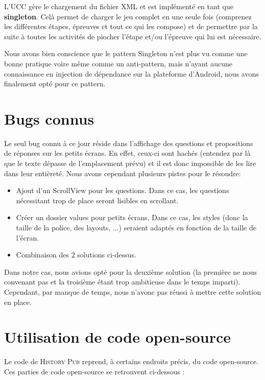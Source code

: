 \documentclass[11pt]{scrreprt}
\begin{document}
    L'UCC gère le chargement du fichier XML et est implémenté en tant que \textbf{singleton}. Celà permet de charger le jeu complet en une seule fois (comprenez les différentes étapes, épreuves et tout ce qui les compose) et de permettre par la suite à toutes les activités de piocher l'étape et/ou l'épreuve qui lui est nécessaire.

    Nous avons bien conscience que le pattern Singleton n'est plus vu comme une bonne pratique voire même comme un anti-pattern, mais n'ayant aucune connaissance en injection de dépendance sur la plateforme d'Android, nous avons finalement opté pour ce pattern.

    \chapter{Bugs connus}
    Le seul bug connu à ce jour réside dans l'affichage des questions et propositions de réponses sur les petits écrans. En effet, ceux-ci sont hachés (entendez par là que le texte dépasse de l'emplacement prévu) et il est donc impossible de les lire dans leur entièreté.
    Nous avons cependant plusieurs pistes pour le résoudre:
    \begin{itemize}
        \item Ajout d'un ScrollView pour les questions. Dans ce cas, les questions nécessitant trop de place seront lisibles en scrollant.
        \item Créer un dossier values pour petits écrans. Dans ce cas, les styles (donc la taille de la police, des layouts, ...) seraient adaptés en fonction de la taille de l'écran.
        \item Combinaison des 2 solutions ci-dessus.
    \end{itemize}
    Dans notre cas, nous avions opté pour la deuxième solution (la première ne nous convenant pas et la troisième étant trop ambitieuse dans le temps imparti). Cependant, par manque de temps, nous n'avonc pas réussi à mettre cette solution en place.

    \chapter{Utilisation de code open-source}
    Le code de \textsc{History Pub} reprend, à certains endroits précis, du code open-source. Ces parties de code open-source se retrouvent ci-dessous :
\end{document}
